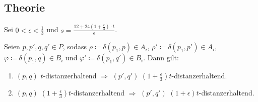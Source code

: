 \documentclass{beamer}
\begin{document}
	\subsection{Theorie}
	\begin{frame}
		Sei $0 < \epsilon < \frac{1}{3} $ und $s = \frac{12 + 24(1 + \frac{\epsilon}{3})\cdot t}{\epsilon}$.
		\begin{lemma}
	    	Seien $p, p', q, q' \in P$, sodass $\rho \coloneqq \delta(p_1, p) \in A_i$, $\rho' \coloneqq \delta(p_1, p') \in A_i$, $\varphi \coloneqq \delta(p_1, q) \in B_i$ und $\varphi' \coloneqq \delta(p_1, q') \in B_i$. Dann gilt:
	    	\begin{enumerate}
	    		\item $(p, q)$ $t$-distanzerhaltend $\Rightarrow$ $(p', q')$ $(1 + \frac{\epsilon}{3})t$-distanzerhaltend.
	    		\item $(p, q)$ $(1 + \frac{\epsilon}{3})t$-distanzerhaltend $\Rightarrow$ $(p', q')$ $(1 + \epsilon)t$-distanzerhaltend.
	    	\end{enumerate}
		\end{lemma}
		\begin{figure}
			\def \svgwidth{\textwidth}
		\end{figure}
	\end{frame}
	
\end{document}
